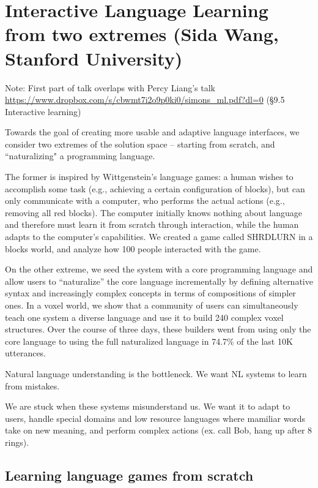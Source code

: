 \section{Interactive Language Learning from two extremes (Sida Wang, Stanford University)}

Note: First part of talk overlaps with Percy Liang's talk \url{https://www.dropbox.com/s/cbwmt7i2o9p0ki0/simons_ml.pdf?dl=0} (\S9.5 Interactive learning)

Towards the goal of creating more usable and adaptive language interfaces, we consider two extremes of the solution space -- starting from scratch, and ``naturalizing" a programming language.

The former is inspired by Wittgenstein's language games: a human wishes to accomplish some task (e.g., achieving a certain configuration of blocks), but can only communicate with a computer, who performs the actual actions (e.g., removing all red blocks). The computer initially knows nothing about language and therefore must learn it from scratch through interaction, while the human adapts to the computer's capabilities. We created a game called SHRDLURN in a blocks world, and analyze how 100 people interacted with the game.

On the other extreme, we seed the system with a core programming language and allow users to ``naturalize'' the core language incrementally by defining alternative syntax and increasingly complex concepts in terms of compositions of simpler ones. In a voxel world, we show that a community of users can simultaneously teach one system a diverse language and use it to build 240 complex voxel structures. Over the course of three days, these builders went from using only the core language to using the full naturalized language in 74.7\% of the last 10K utterances.

Natural language understanding is the bottleneck. We want NL systems to learn from mistakes.

We are stuck when these systems misunderstand us. We want it to adapt to users, handle special domains and low resource languages where mamiliar words take on new meaning, and perform complex actions (ex. call Bob, hang up after 8 rings).

\subsection{Learning language games from scratch}




